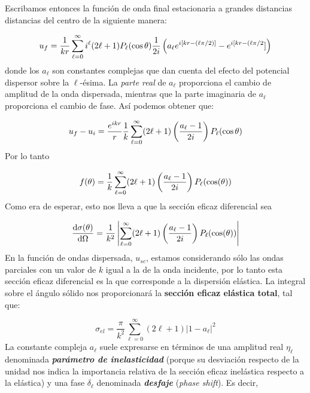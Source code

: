 Escribamos entonces la función de onda final estacionaria a grandes distancias distancias del centro de la siguiente manera:

\begin{equation}
	u_f = \frac{1}{kr} \sum_{\ell=0}^{\infty} i^\ell (2\ell +1 ) P_\ell (\cos \theta) \frac{1}{2i} \left( a_\ell e^{i[kr-(\ell \pi /2)]} - e^{i[kr-(\ell\pi/2}] \right)  \label{Ec:03-03-23}
\end{equation}
donde los $a_\ell$ son constantes complejas que dan cuenta del efecto del potencial dispersor sobre la $\ell$-ésima. La \textit{parte real} de $a_\ell$ proporciona el cambio de amplitud de la onda dispersada, mientras que la parte imaginaria de $a_\ell$ proporciona el cambio de fase. Así podemos obtener que:

\begin{equation}
	u_f - u_i  = \frac{e^{ikr}}{r} \frac{1}{k} \sum_{\ell=0}^{\infty} (2\ell +1) \left( \frac{a_\ell-1}{2i} \right) P_\ell (\cos \theta)
\end{equation}
Por lo tanto 

\begin{equation}
	f(\theta ) = \frac{1}{k} \sum_{\ell=0}^{\infty} (2\ell +1) \left( \frac{a_\ell-1}{2i} \right) P_\ell (\cos (\theta))
\end{equation}
Como era de esperar, esto nos lleva a que la sección eficaz diferencial sea

\begin{equation}
	\frac{\mathrm{d} \sigma (\theta)}{\mathrm{d} \Omega} = \frac{1}{k^2}\left| \sum_{\ell=0}^{\infty} (2\ell +1) \left( \frac{a_\ell-1}{2i} \right) P_\ell (\cos (\theta)) \right|
\end{equation}
En la función de ondas dispersada, $u_{sc}$, estamos considerando sólo las ondas parciales con un valor de $k$ igual a la de la onda incidente, por lo tanto esta sección eficaz diferencial es la que corresponde a la dispersión elástica. La integral sobre el ángulo sólido nos proporcionará la \textbf{sección eficaz elástica total}, tal que:

\begin{equation}
	\sigma_{el} = \frac{\pi}{k^2} \sum_{\ell=0}^{\infty} (2\ell+1)|1-a_\ell|^2 \label{Ec:03-03-27}
\end{equation}
La constante compleja $a_\ell$ suele expresarse en términos de una amplitud real $\eta_\ell$ denominada \textbf{\textit{parámetro de inelasticidad}} (porque su desviación respecto de la unidad nos indica la importancia relativa de la sección eficaz inelástica respecto a la elástica) y una fase $\delta_\ell$ denominada \textit{\textbf{desfaje}} (\textit{phase shift}). Es decir, 


